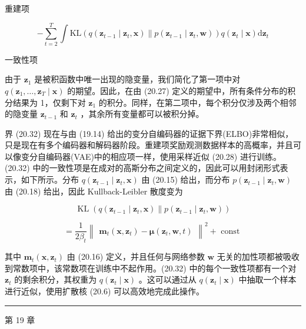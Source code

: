 \documentclass[10pt]{report}
\newcommand{\HRule}{\begin{center}\rule{0.9\linewidth}{0.2mm}\end{center}}
\begin{document}
重建项

\[
- \mathop{\sum }\limits_{{t = 2}}^{T}\int \mathrm{{KL}}\left( {q\left( {{\mathbf{z}}_{t - 1} \mid  {\mathbf{z}}_{t},\mathbf{x}}\right) \parallel p\left( {{\mathbf{z}}_{t - 1} \mid  {\mathbf{z}}_{t},\mathbf{w}}\right) }\right) q\left( {{\mathbf{z}}_{t} \mid  \mathbf{x}}\right) \mathrm{d}{\mathbf{z}}_{t} \tag{20.32}
\]

一致性项

由于 \({\mathbf{z}}_{1}\) 是被积函数中唯一出现的隐变量，我们简化了第一项中对 \(q\left( {{\mathbf{z}}_{1},\ldots ,{\mathbf{z}}_{T} \mid  \mathbf{x}}\right)\) 的期望。因此，在由 (20.27) 定义的期望中，所有条件分布的积分结果为 1，仅剩下对 \({\mathbf{z}}_{1}\) 的积分。同样，在第二项中，每个积分仅涉及两个相邻的隐变量 \({\mathbf{z}}_{t - 1}\) 和 \({\mathbf{z}}_{t}\) ，其余所有变量都可以被积分掉。

界 (20.32) 现在与由 (19.14) 给出的变分自编码器的证据下界(ELBO)非常相似，只是现在有多个编码器和解码器阶段。重建项奖励观测数据样本的高概率，并且可以像变分自编码器(VAE)中的相应项一样，使用采样近似 (20.28) 进行训练。(20.32) 中的一致性项是在成对的高斯分布之间定义的，因此可以用封闭形式表示，如下所示。分布 \(q\left( {{\mathbf{z}}_{t - 1} \mid  {\mathbf{z}}_{t},\mathbf{x}}\right)\) 由 (20.15) 给出，而分布 \(p\left( {{\mathbf{z}}_{t - 1} \mid  {\mathbf{z}}_{t},\mathbf{w}}\right)\) 由 (20.18) 给出，因此 Kullback-Leibler 散度变为

\[
\operatorname{KL}\left( {q\left( {{\mathbf{z}}_{t - 1} \mid  {\mathbf{z}}_{t},\mathbf{x}}\right) \parallel p\left( {{\mathbf{z}}_{t - 1} \mid  {\mathbf{z}}_{t},\mathbf{w}}\right) }\right)
\]

\[
= \frac{1}{2{\beta }_{t}}{\begin{Vmatrix}{\mathbf{m}}_{t}\left( \mathbf{x},{\mathbf{z}}_{t}\right)  - \mathbf{\mu }\left( {\mathbf{z}}_{t},\mathbf{w},t\right) \end{Vmatrix}}^{2} + \text{ const } \tag{20.33}
\]

其中 \({\mathbf{m}}_{t}\left( {\mathbf{x},{\mathbf{z}}_{t}}\right)\) 由 (20.16) 定义，并且任何与网络参数 \(\mathbf{w}\) 无关的加性项都被吸收到常数项中，该常数项在训练中不起作用。(20.32) 中的每个一致性项都有一个对 \({\mathbf{z}}_{t}\) 的剩余积分，其权重为 \(q\left( {{\mathbf{z}}_{t} \mid  \mathbf{x}}\right)\) 。这可以通过从 \(q\left( {{\mathbf{z}}_{t} \mid  \mathbf{x}}\right)\) 中抽取一个样本进行近似，使用扩散核 (20.6) 可以高效地完成此操作。

\HRule

第 19 章
\end{document}
